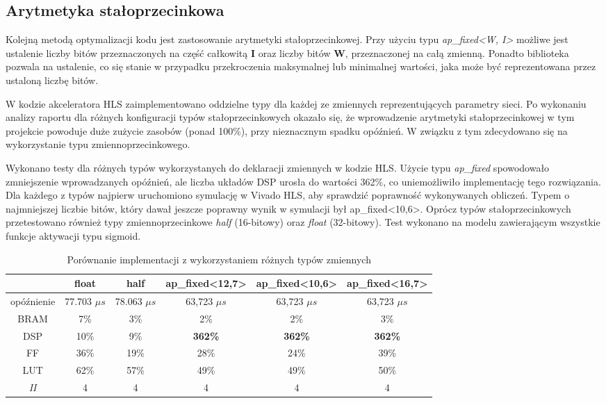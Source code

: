 \subsection{Arytmetyka stałoprzecinkowa}

Kolejną metodą optymalizacji kodu jest zastosowanie arytmetyki stałoprzecinkowej. Przy użyciu typu \emph{ap\_fixed<W, I>} możliwe jest ustalenie liczby bitów przeznaczonych na część całkowitą \textbf{I} oraz liczby bitów \textbf{W}, przeznaczonej na całą zmienną. Ponadto biblioteka pozwala na ustalenie, co się stanie w przypadku przekroczenia maksymalnej lub minimalnej wartości, jaka może być reprezentowana przez ustaloną liczbę bitów.

W kodzie akceleratora HLS zaimplementowano oddzielne typy dla każdej ze zmiennych reprezentujących parametry sieci. Po wykonaniu analizy raportu dla różnych konfiguracji typów stałoprzecinkowych okazało się, że wprowadzenie arytmetyki stałoprzecinkowej w tym projekcie powoduje duże zużycie zasobów (ponad 100\%), przy nieznacznym spadku opóźnień. W związku z tym zdecydowano się na wykorzystanie typu zmiennoprzecinkowego.

Wykonano testy dla różnych typów wykorzystanych do deklaracji zmiennych w kodzie HLS. Użycie typu \emph{ap\_fixed} spowodowało zmniejszenie wprowadzanych opóźnień, ale liczba układów DSP urosła do wartości 362\%, co uniemożliwiło implementację tego rozwiązania. Dla każdego z typów najpierw uruchomiono symulację w Vivado HLS, aby sprawdzić poprawność wykonywanych obliczeń.
Typem o najmniejszej liczbie bitów, który dawał jeszcze poprawny wynik w symulacji był ap\_fixed<10,6>. Oprócz typów stałoprzecinkowych przetestowano również typy zmiennoprzecinkowe \emph{half} (16-bitowy) oraz \emph{float} (32-bitowy). Test wykonano na modelu zawierającym wszystkie funkcje aktywacji typu sigmoid.

\begin{table}[h] \centering
  \caption{Porównanie implementacji z wykorzystaniem różnych typów zmiennych}
  \centering
  \begin{tabular} {c|c|c|c|c|c} \hline \label{tab:fixed-vs-float}  
                  & float           & half            & ap\_fixed<12,7> & ap\_fixed<10,6> & ap\_fixed<16,7> \\ \hline
    opóźnienie    & 77.703 $\mu s$  & 78.063 $\mu s$  & 63,723 $\mu s$  & 63,723 $\mu s$  & 63,723 $\mu s$  \\
    BRAM          & 7\%             & 3\%             & 2\%             & 2\%             & 3\%             \\
    DSP           & 10\%            & 9\%             & \textbf{362\%}  & \textbf{362\%}  & \textbf{362\%}  \\
    FF            & 36\%            & 19\%            & 28\%            & 24\%            & 39\%            \\
    LUT           & 62\%            & 57\%            & 49\%            & 49\%            & 50\%            \\
    \emph{II}     & 4               & 4               & 4               & 4               &  4              \\
  \end{tabular}
\end{table}

